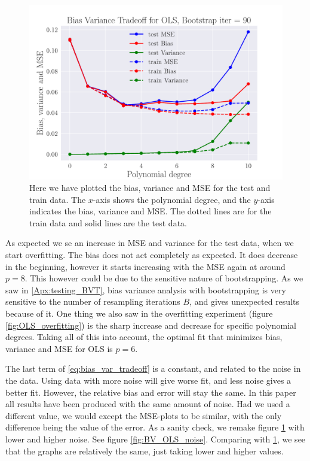 \documentclass[reprint,english,notitlepage,aps,nobalancelastpage,nofootinbib]{revtex4-1}  %
\begin{document}
\begin{figure}[H]
	\includegraphics[width=\linewidth]{BVT_OLS_n30_eps0_2.pdf}
	\caption{Here we have plotted the bias, variance and MSE for the test and train data. The $x$-axis shows the polynomial degree, and the $y$-axis indicates the bias, variance and MSE. The dotted lines are for the train data and solid lines are the test data.}\label{fig:BV_OLS}
\end{figure}

As expected we se an increase in MSE and variance for the test data, when we start overfitting. The bias does not act completely as expected. It does decrease in the beginning, however it starts increasing with the MSE again at around $p = 8$. This however could be due to the sensitive nature of bootstrapping. As we saw in \ref{Apx:testing_BVT}, bias variance analysis with bootstrapping is very sensitive to the number of resampling iterations $B$, and gives unexpected results because of it. One thing we also saw in the overfitting experiment (figure \ref{fig:OLS_overfitting}) is the sharp increase and decrease for specific polynomial degrees. Taking all of this into account, the optimal fit that minimizes bias, variance and MSE for OLS is $p=6$.

The last term of \eqref{eq:bias_var_tradeoff} is a constant, and related to the noise in the data. Using data with more noise will give worse fit, and less noise gives a better fit. However, the relative bias and error will stay the same.  In this paper all results have been produced with the same amount of noise. Had we used a different value, we would except the MSE-plots to be similar, with the only difference being the value of the error. As a sanity check, we remake figure \ref{fig:BV_OLS} with lower and higher noise. See figure \ref{fig:BV_OLS_noise}. Comparing with \ref{fig:BV_OLS}, we see that the graphs are relatively the same, just taking lower and higher values.
\end{document}
